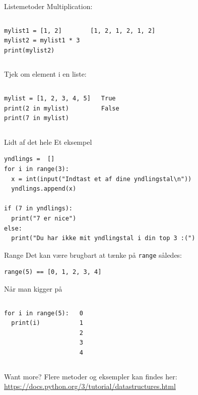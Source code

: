 \begin{frame}[fragile]{Listemetoder}
	Multiplication:
	\begin{columns}
		\begin{lstlisting}[style=python]
mylist1 = [1, 2]
mylist2 = mylist1 * 3
print(mylist2)
		\end{lstlisting}
		\begin{lstlisting}[style=python]
[1, 2, 1, 2, 1, 2]
		\end{lstlisting}
	\end{columns}
	\pause
	Tjek om element i en liste:
	\begin{columns}
		\column{0.4\textwidth}
		\begin{lstlisting}[style=python]
mylist = [1, 2, 3, 4, 5]
print(2 in mylist)
print(7 in mylist)
		\end{lstlisting}
		\column{0.4\textwidth}
		\begin{lstlisting}[style=python]
True
False
		\end{lstlisting}
	\end{columns}
\end{frame}

\begin{frame}[fragile]{Lidt af det hele}
Et eksempel
	\begin{lstlisting}[style=python]
yndlings =  []
for i in range(3):
  x = int(input("Indtast et af dine yndlingstal\n"))
  yndlings.append(x)

if (7 in yndlings):
  print("7 er nice")
else:
  print("Du har ikke mit yndlingstal i din top 3 :(")
	\end{lstlisting}
\end{frame}

\begin{frame}[fragile]{Range}
Det kan være brugbart at tænke på \texttt{range} således:


\begin{lstlisting}[style=python]
range(5) == [0, 1, 2, 3, 4]
\end{lstlisting}

\pause
Når man kigger på 

	\begin{columns}
	\begin{lstlisting}[style=python]
for i in range(5):
  print(i)
	\end{lstlisting}
	\begin{lstlisting}[style=python]
0
1
2
3
4
	\end{lstlisting}
\end{columns}

\end{frame}

\begin{frame}{Want more?}
	Flere metoder og eksempler kan findes her:\\
	\url{https://docs.python.org/3/tutorial/datastructures.html}
\end{frame}


